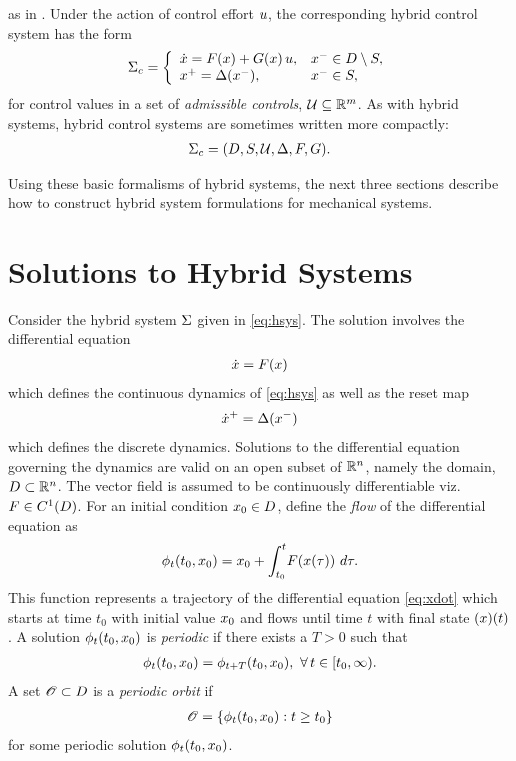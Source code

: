 as in \cite{Sinnet2009}.
%
Under the action of control effort $u$, the corresponding hybrid control
system has the form
%
\begin{align}
  \Sigma_{c} = \left\{
  \begin{array}{l l}
    {\dot {x}} = F(x) + G(x) \, u, & x^{-} \in D \setminus S,\\
    x^{+} = \Delta(x^{-}), & x^{-} \in S,
  \end{array}\right.
  \label{eq:hcsys}
\end{align}
%
for control values in a set of {\em admissible controls}, $\mathcal{U} \subseteq \mathbb{R}^{m}$.
%
As with hybrid systems, hybrid control systems are sometimes written more
compactly:
\begin{align*}
  \Sigma_{c} = (D, S, \mathcal{U}, \Delta, F, G).
\end{align*}

Using these basic formalisms of hybrid systems, the next three sections describe
how to construct hybrid system formulations for mechanical systems.

\section{Solutions to Hybrid Systems} \label{sec:hsys-sol}
Consider the hybrid system $\Sigma$ given in \eqref{eq:hsys}.
%
The solution involves the differential equation
\begin{align}
  \label{eq:xdot}
  {\dot {x}} = F(x)
\end{align}
which defines the continuous dynamics of \eqref{eq:hsys} as well as the reset
map
\begin{align}
  \label{eq:rmap}
  {\dot {x}}^{+} = \Delta(x^{-})
\end{align}
which defines the discrete dynamics.
%
Solutions to the differential equation governing the dynamics are valid on an
open subset of $\mathbb{R}^{n}$, namely the domain, $D \subset \mathbb{R}^{n}$.
%
The vector field is assumed to be continuously differentiable viz. $F \in
C^{1}(D)$.
%
For an initial condition $x_{0} \in D$, define the {\em flow} of the
differential equation as
\begin{align*}
  \flowt(t_{0}, \x_{0}) = \x_{0} + \int_{t_{0}}^{t} \! \xf(\x\argtau) \ d\tau.
\end{align*}
%
This function represents a trajectory of the differential equation
\eqref{eq:xdot} which starts at time $t_{0}$ with initial value $x_{0}$ and
flows until time $t$ with final state $(x)(t)$.
%
A solution $\phi_{t}(t_{0}, x_{0})$ is {\em periodic} if there exists a $T > 0$
such that
\begin{align*}
  \phi_{t}(t_{0}, x_{0}) = \phi_{t + T}(t_{0}, x_{0}), \ \forall \, t \in [t_{0}, \infty).
\end{align*}
%
A set ${\mathscr O} \subset D$ is a {\em periodic orbit} if
\begin{align*}
  {\mathscr O} = \{ \phi_{t}(t_{0}, x_{0}) : t \geq t_{0} \}
\end{align*}
for some periodic solution $\phi_{t}(t_{0}, x_{0})$.

